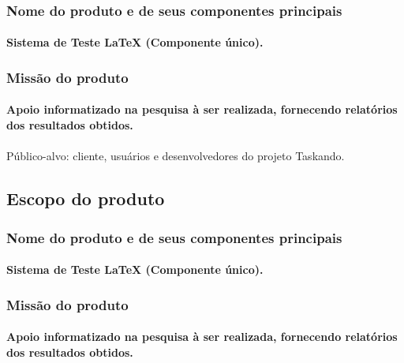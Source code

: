 \documentclass{article}
\begin{document}
		\subsubsection{Nome do produto e de seus componentes principais}
			\paragraph{Sistema de Teste LaTeX (Componente único). }
		\subsubsection{Missão do produto}
			\paragraph{Apoio informatizado na pesquisa à ser realizada, fornecendo relatórios dos resultados obtidos.}
			
			\paragraph{}Público-alvo: cliente, usuários e desenvolvedores do projeto Taskando.
	\subsection{Escopo do produto}
		\subsubsection{Nome do produto e de seus componentes principais}
			\paragraph{Sistema de Teste LaTeX (Componente único). }
		\subsubsection{Missão do produto}
			\paragraph{Apoio informatizado na pesquisa à ser realizada, fornecendo relatórios dos resultados obtidos.}
			
\end{document}
